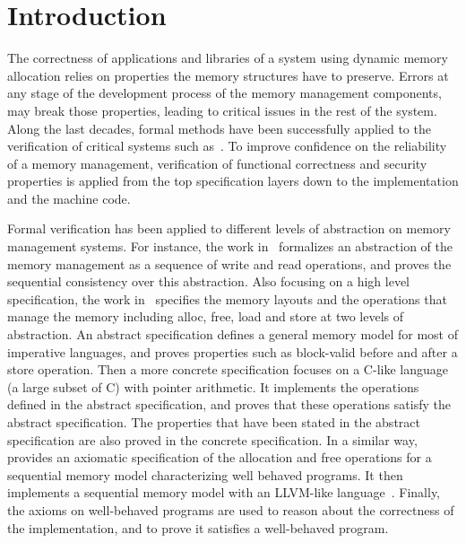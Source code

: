 \section{Introduction}
The correctness of applications and libraries of a system using dynamic memory allocation relies on properties the memory structures have to preserve. Errors at any stage of the development process of the memory management components, may break those properties, leading to critical issues in the rest of the system. Along the last decades, formal methods have been successfully applied to the verification of critical systems such as~\cite{reg_rushby, reg_luu}. To improve confidence on the reliability of a memory management, verification of functional correctness and security properties is applied from the top specification layers down to the implementation and the machine code.

Formal verification has been applied to different levels of abstraction on memory management systems. For instance, the work in~\cite{reg_higham} formalizes an abstraction of the memory management as a sequence of write and read operations, and proves the sequential consistency over this abstraction. Also focusing on a high level specification, the work in~\cite{reg_blazy} specifies the memory layouts and the operations that manage the memory including alloc, free, load and store at two levels of abstraction. An abstract specification defines a general memory model for most of imperative languages, and proves properties such as block-valid before and after a store operation. Then a more concrete specification focuses on a C-like language (a large subset of C) with pointer arithmetic. It implements the operations defined in the abstract specification, and proves that these operations satisfy the abstract specification. The properties that have been stated in the abstract specification are also proved in the concrete specification. In a similar way,~\cite{reg_mansky} provides an axiomatic specification of the allocation and free operations for a sequential memory model characterizing well behaved programs. It then implements a sequential memory model with an LLVM-like language~\cite{reg_chris}. Finally, the axioms on well-behaved programs are used to reason about the correctness of the implementation, and to prove it satisfies a well-behaved program.

